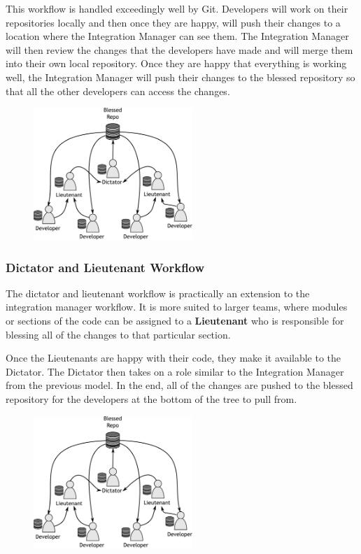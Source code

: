 This workflow is handled exceedingly well by Git.  Developers will work on their repositories locally and then once they are happy, will push their changes to a location where the Integration Manager can see them.  The Integration Manager will then review the changes that the developers have made and will merge them into their own local repository.  Once they are happy that everything is working well, the Integration Manager will push their changes to the blessed repository so that all the other developers can access the changes.

\begin{figure}[htbp]
\includegraphics[width=6cm]{d1.pdf}
\end{figure}

\subsubsection{Dictator and Lieutenant Workflow}

The dictator and lieutenant workflow is practically an extension to the integration manager workflow.  It is more suited to larger teams, where modules or sections of the code can be assigned to a \textbf{Lieutenant} who is responsible for blessing all of the changes to that particular section.

Once the Lieutenants are happy with their code, they make it available to the Dictator.  The Dictator then takes on a role similar to the Integration Manager from the previous model.  In the end, all of the changes are pushed to the blessed repository for the developers at the bottom of the tree to pull from.

\begin{figure}
\includegraphics[width=6cm]{d1.pdf}
\end{figure}

